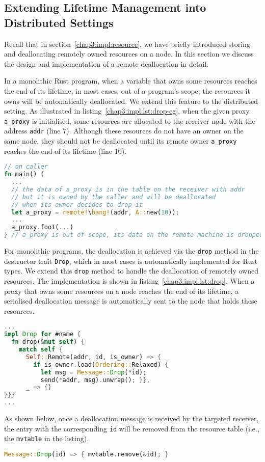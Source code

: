 \subsection{Extending Lifetime Management into Distributed Settings}
\label{chap3:impl:lifetime}
Recall that in section~\ref{chap3:impl:resource}, we have briefly introduced storing and deallocating remotely owned resources on a node. In this section we discuss the design and implementation of a remote deallocation in detail. 

In a monolithic Rust program, when a variable that owns some resources reaches the end of its lifetime, in most cases, out of a program's scope, the resources it owns will be automatically deallocated. We extend this feature to the distributed setting. As illustrated in listing~\ref{chap3:impl:lst:drop-eg}, when the given proxy \texttt{a\_proxy} is initialised, some resources are allocated to the receiver node with the address \texttt{addr} (line 7). Although these resources do not have an owner on the same node, they should not be deallocated until its remote owner \texttt{a\_proxy} reaches the end of its lifetime (line 10). 
\begin{lstlisting}[language=Rust, style=boxed, basicstyle=\footnotesize\ttfamily, caption={An example of a remote deallocation}, label=chap3:impl:lst:drop-eg]
// on caller
fn main() {
  ...
  // the data of a_proxy is in the table on the receiver with addr
  // but it is owned by the caller and will be deallocated
  // when its owner decides to drop it
  let a_proxy = remote!\bang!(addr, A::new(10)); 
  ...
  a_proxy.foo1(...)
} // a_proxy is out of scope, its data on the remote machine is dropped
\end{lstlisting}

For monolithic programs, the deallocation is achieved via the \texttt{drop} method in the destructor trait \texttt{Drop}, which in most cases is automatically implemented for Rust types. We extend this \texttt{drop} method to handle the deallocation of remotely owned resources. The implementation is shown in listing~\ref{chap3:impl:lst:drop}.
When a proxy that owns some resources on a node reaches the end of its lifetime, a serialised deallocation message is automatically sent to the node that holds these resources. 
\begin{lstlisting}[language=Rust, style=boxed, basicstyle=\footnotesize\ttfamily, caption={The implementation of a remote deallocation}, label=chap3:impl:lst:drop]
...
impl Drop for #name {
  fn drop(&mut self) {
    match self {
      Self::Remote(addr, id, is_owner) => {
        if is_owner.load(Ordering::Relaxed) {
          let msg = Message::Drop(*id);
          send(*addr, msg).unwrap(); }},
      _ => {}
}}}
...
\end{lstlisting}
As shown below, once a deallocation message is received by the targeted receiver, the entry with the corresponding \texttt{id} will be removed from the resource table (i.e., the \texttt{mvtable} in the listing). 
\begin{lstlisting}[language=Rust, style=boxed, basicstyle=\footnotesize\ttfamily]
Message::Drop(id) => { mvtable.remove(&id); }
\end{lstlisting}

